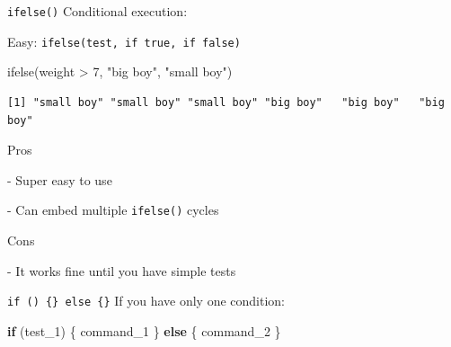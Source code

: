 \documentclass[
  ignorenonframetext,
]{beamer}
\newenvironment{Shaded}{\begin{snugshade}}{\end{snugshade}}
\newcommand{\ControlFlowTok}[1]{\textcolor[rgb]{0.12,0.11,0.11}{\textbf{#1}}}
\newcommand{\DecValTok}[1]{\textcolor[rgb]{0.69,0.50,0.00}{#1}}
\newcommand{\FunctionTok}[1]{\textcolor[rgb]{0.39,0.29,0.61}{#1}}
\newcommand{\NormalTok}[1]{\textcolor[rgb]{0.12,0.11,0.11}{#1}}
\newcommand{\SpecialCharTok}[1]{\textcolor[rgb]{0.24,0.68,0.91}{#1}}
\newcommand{\StringTok}[1]{\textcolor[rgb]{0.75,0.01,0.01}{#1}}
\begin{document}
\begin{frame}[fragile]{\texttt{ifelse()}}
\protect\hypertarget{ifelse}{}
Conditional execution:

Easy: \texttt{ifelse(test,\ if\ true,\ if\ false)}

\begin{Shaded}
\begin{Highlighting}[]
\FunctionTok{ifelse}\NormalTok{(weight }\SpecialCharTok{\textgreater{}} \DecValTok{7}\NormalTok{, }\StringTok{"big boy"}\NormalTok{, }\StringTok{"small boy"}\NormalTok{)}
\end{Highlighting}
\end{Shaded}

\begin{verbatim}
[1] "small boy" "small boy" "small boy" "big boy"   "big boy"   "big boy"  
\end{verbatim}

\begin{exampleblock}{Pros}

- Super easy to use

- Can embed multiple \texttt{ifelse()} cycles
\end{exampleblock}

\begin{alertblock}{Cons}

- It works fine until you have simple tests
\end{alertblock}
\end{frame}

\begin{frame}[fragile]{\texttt{if\ ()\ \{\}\ else\ \{\}}}
\protect\hypertarget{if-else}{}
If you have only one condition:

\begin{Shaded}
\begin{Highlighting}[]
\ControlFlowTok{if}\NormalTok{ (test\_1) \{}
\NormalTok{  command\_1}
\NormalTok{\} }\ControlFlowTok{else}\NormalTok{ \{}
\NormalTok{  command\_2}
\NormalTok{\}}
\end{Highlighting}
\end{Shaded}
\end{frame}
\end{document}
